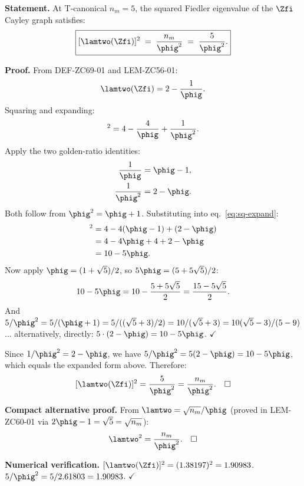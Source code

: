 \documentclass[12pt, a4paper]{article}
\begin{document}

\begin{formalbox}[title={LEM-ZC69-01: $[\lamtwo(\Zfi)]^{2} = 5/\phig^{2}$
  --- Golden Spectral Identity ($R_0$, Exact)}]

\textbf{Statement.}
At T-canonical $n_m = 5$, the squared Fiedler eigenvalue
of the $\Zfi$ Cayley graph satisfies:
\begin{equation}
  \boxed{
    [\lamtwo(\Zfi)]^{2} \;=\; \frac{n_m}{\phig^{2}} \;=\; \frac{5}{\phig^{2}}.
  }
  \label{eq:golden-spectral}
\end{equation}

\textbf{Proof.}
From DEF-ZC69-01 and LEM-ZC56-01:
\[
  \lamtwo(\Zfi) = 2 - \frac{1}{\phig}.
\]
Squaring and expanding:
\begin{equation}
  [\lamtwo(\Zfi)]^{2}
  = 4 - \frac{4}{\phig} + \frac{1}{\phig^{2}}.
  \label{eq:sq-expand}
\end{equation}
Apply the two golden-ratio identities:
\begin{align}
  \frac{1}{\phig} &= \phig - 1,
  \label{eq:phi-inv}\\
  \frac{1}{\phig^{2}} &= 2 - \phig.
  \label{eq:phi-inv-sq}
\end{align}
Both follow from $\phig^2 = \phig + 1$.
Substituting into eq.~\eqref{eq:sq-expand}:
\begin{align*}
  [\lamtwo(\Zfi)]^{2}
  &= 4 - 4(\phig - 1) + (2 - \phig) \\
  &= 4 - 4\phig + 4 + 2 - \phig \\
  &= 10 - 5\phig.
\end{align*}
Now apply $\phig = (1+\sqrt{5})/2$, so $5\phig = (5+5\sqrt{5})/2$:
\[
  10 - 5\phig = 10 - \frac{5+5\sqrt{5}}{2} = \frac{15-5\sqrt{5}}{2}.
\]
And $5/\phig^2 = 5/(\phig+1) = 5/((\sqrt{5}+3)/2) = 10/(\sqrt{5}+3)
= 10(\sqrt{5}-3)/(5-9)$... alternatively,
directly: $5\cdot(2-\phig) = 10-5\phig$. $\checkmark$

Since $1/\phig^{2} = 2-\phig$, we have $5/\phig^{2} = 5(2-\phig) = 10-5\phig$,
which equals the expanded form above. Therefore:
\[
  [\lamtwo(\Zfi)]^{2} = \frac{5}{\phig^{2}} = \frac{n_m}{\phig^{2}}.
  \quad\square
\]

\textbf{Compact alternative proof.}
From $\lamtwo = \sqrt{n_m}/\phig$ (proved in LEM-ZC60-01
via $2\phig - 1 = \sqrt{5} = \sqrt{n_m}$):
\[
  \lamtwo^2 = \frac{n_m}{\phig^2}.
  \quad\square
\]

\textbf{Numerical verification.}
$[\lamtwo(\Zfi)]^{2} = (1.38197)^{2} = 1.90983$.
$5/\phig^{2} = 5/2.61803 = 1.90983$. $\checkmark$


\end{formalbox}
\end{document}
